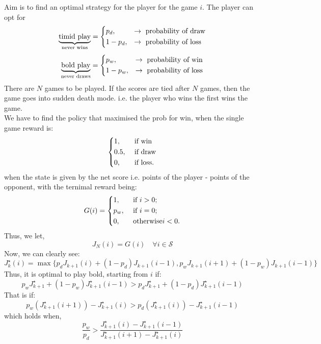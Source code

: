 \begin{example}
    Aim is to find an optimal strategy for the player for the game \(i\). The player can opt for
    \[
            \underbrace{\text{timid play}}_{\text{never wins}}
     =  \begin{dcases}
            p_d, &\to \text{ probability of draw} \\
            1-p_d, &\to \text{ probability of loss}
        \end{dcases}
    \]
    \[
        \underbrace{\text{bold play}}_{\text{never draws}}
        =  \begin{dcases}
               p_w, &\to \text{ probability of win} \\
               1-p_w, &\to \text{ probability of loss}
           \end{dcases}
    \]
    There are \(N\) games to be played. If the scores are tied after \(N\) games, then the game goes into
    sudden death mode. i.e. the player who wins the first wins the game.\\
    We have to find the policy that maximised the prob for win, when the single game reward is:
    \[
        \begin{dcases}
            1, &\text{ if win }\\
            0.5, &\text{ if draw}\\
            0, &\text{ if loss} .
        \end{dcases}
    \]
    when the state is given by the net score i.e. points of the player - points of the opponent, with the
    ternimal reward being:
    \[
        G(i) = \begin{dcases}
            1, &\text{ if } i> 0 ;\\
            p_w, &\text{ if } i=0  ;\\
            0, &\text{ otherwise} i<0.
        \end{dcases}
    \]
    Thus, we let,
    \[
        J_N(i) = G(i) \quad \forall i \in \mathcal{S}
    \]
    Now, we can clearly see:
    \[
        J^{\star} _k(i) = \max \{
            p_d J_{k+1} (i) + (1-p_d)J_{k+1} (i-1), p_w J_{k+1} (i+1) + (1-p_w)J_{k+1} (i-1)
            \}
    \]
    Thus, it is optimal to play bold, starting from \(i\) if:
    \[
        p_w J^{\star}_{k+1} + (1-p_w)J^{\star}_{k+1}(i-1) > p_d J^{\star}_{k+1} + (1-p_d)J^{\star}_{k+1}(i-1)
    \]
    That is if:
    \[
        p_w(J^{\star}_{k+1}(i+1) ) - J^{\star}_{k+1}(i) > p_d(J^{\star}_{k+1}(i) ) - J^{\star}_{k+1}(i-1)
    \]
    which holds when,
    \[
        \frac{p_w}{p_d} > \frac{J^{\star}_{k+1}(i) - J^{\star}_{k+1}(i-1)}
        {J^{\star}_{k+1}(i+1) - J^{\star}_{k+1}(i)}
    \]


\end{example}
